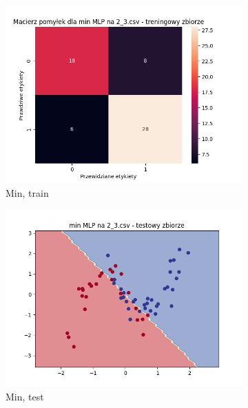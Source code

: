 \documentclass[12pt]{article}
\newcommand*{\subfigwidth}{0.24\textwidth}
\begin{document}
\begin{figure}[H]
\begin{subfigure}[t]{\subfigwidth}
        \includegraphics[width=\linewidth]{img/exp_3/mlp/2_3/min/train_matrix.png}
        \caption{Min, train}
    \end{subfigure}
    \hfill
    \begin{subfigure}[t]{\subfigwidth}
        \includegraphics[width=\linewidth]{img/exp_3/mlp/2_3/min/test_boundary.png}
        \caption{Min, test}
    \end{subfigure}
    \hfill
    \begin{subfigure}[t]{\subfigwidth}

\end{subfigure}
\end{figure}
\end{document}
